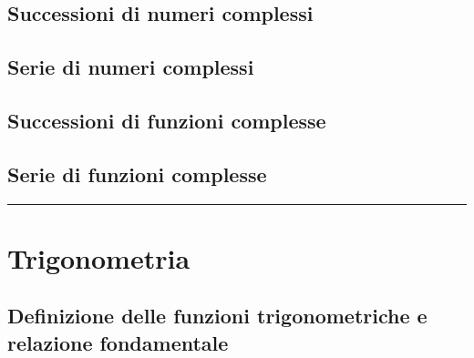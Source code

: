 \documentclass[letterpaper,10pt,italian]{jupyterBook}
\begin{document}
\section{Successioni di numeri complessi}
\label{\detokenize{ch/series:successioni-di-numeri-complessi}}\label{\detokenize{ch/series:math-hs-series-complex-sequences}}\label{\detokenize{ch/series:math-hs-series-complex-series}}
\sphinxAtStartPar
{} 


\section{Serie di numeri complessi}
\label{\detokenize{ch/series:serie-di-numeri-complessi}}
\sphinxAtStartPar
{} 


\section{Successioni di funzioni complesse}
\label{\detokenize{ch/series:successioni-di-funzioni-complesse}}\label{\detokenize{ch/series:math-hs-series-fun-complex-sequences}}

\section{Serie di funzioni complesse}
\label{\detokenize{ch/series:serie-di-funzioni-complesse}}\label{\detokenize{ch/series:math-hs-series-fun-complex-series}}

\bigskip\hrule\bigskip


\sphinxstepscope


\chapter{Trigonometria}
\label{\detokenize{ch/trigonometry:trigonometria}}\label{\detokenize{ch/trigonometry:math-hs-trigonometry}}\label{\detokenize{ch/trigonometry::doc}}

\section{Definizione delle funzioni trigonometriche e relazione fondamentale}
\label{\detokenize{ch/trigonometry:definizione-delle-funzioni-trigonometriche-e-relazione-fondamentale}}
\end{document}
